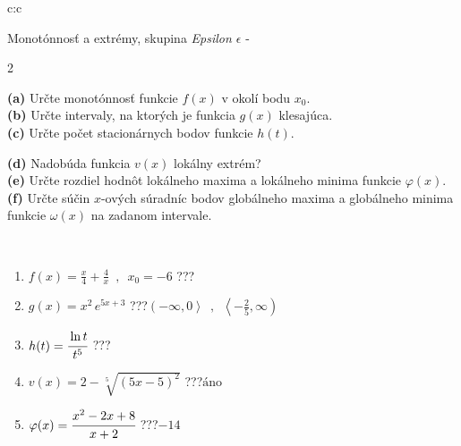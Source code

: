 \documentclass[10pt]{report}
\begin{document}
\newpage
\thispagestyle{empty}
\begin{tabular}{c:c}
\begin{minipage}[c][104.5mm][t]{0.5\linewidth}
\begin{center}
\vspace{7mm}
{\huge Monotónnosť a extrémy, skupina \textit{Epsilon $\epsilon$} -}\\[5mm]
\begin{minipage}{0.95\linewidth}
\begin{center}
{\small \begin{multicols}{2} \raggedright
\textbf{(a)} Určte monotónnosť funkcie \(f(x)\) v okolí bodu \(x_0\). \\[1mm]
\textbf{(b)} Určte intervaly, na ktorých je funkcia \(g(x)\) klesajúca. \\[1mm]
\textbf{(c)} Určte počet stacionárnych bodov funkcie \(h(t)\). \par \columnbreak
\textbf{(d)} Nadobúda funkcia \(v(x)\) lokálny extrém? \\[1mm]
\textbf{(e)} Určte rozdiel hodnôt lokálneho maxima a lokálneho minima funkcie \(\varphi(x)\). \\[1mm]
\textbf{(f)} Určte súčin \(x\)-ových súradníc bodov globálneho maxima a globálneho minima funkcie \(\omega(x)\) na zadanom intervale. \\[1mm]
\end{multicols}
}
\end{center}
\end{minipage}
\\[4mm]
\begin{minipage}{0.79\linewidth}
\begin{center}
\begin{varwidth}{\linewidth}
\begin{enumerate}
\normalsize
\item $f(x)=\frac{x}{4}+\frac{4}{x} \enspace , \enspace x_0=-6$\quad \dotfill\; ???\;\dotfill \quad {}
\item $g(x)=x^2\, e^{5x+3}$\quad \dotfill\; ???\;\dotfill \quad $\left(-\infty , 0\right\rangle\enspace , \enspace \left\langle-\frac{2}{5} , \infty\right)$
\item $h(t)=\cfrac{\ln t}{t^5}$\quad \dotfill\; ???\;\dotfill {}
\item $v(x)=2-\sqrt[5]{(5x-5)^2}$\quad \dotfill\; ???\;\dotfill \quad $\text{áno}$
\item $\varphi(x)=\cfrac{x^2-2x+8}{x+2}$\quad \dotfill\; ???\;\dotfill \quad $-14$

\end{enumerate}
\end{varwidth}
\end{center}
\end{minipage}
\end{center}
\end{minipage}
\end{tabular}
\end{document}
